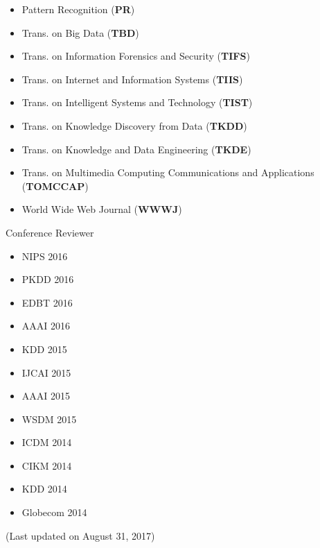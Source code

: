 \documentclass[margin, 9pt]{res}
\begin{document}
\begin{resume}
\begin{itemize}
\item Pattern Recognition (\textbf{PR})
\item Trans. on Big Data (\textbf{TBD})
\item Trans. on Information Forensics and Security (\textbf{TIFS})
\item Trans. on Internet and Information Systems (\textbf{TIIS})
\item Trans. on Intelligent Systems and Technology (\textbf{TIST})
\item Trans. on Knowledge Discovery from Data (\textbf{TKDD})
\item Trans. on Knowledge and Data Engineering (\textbf{TKDE})
\item Trans. on Multimedia Computing Communications and Applications (\textbf{TOMCCAP})
\item World Wide Web Journal (\textbf{WWWJ})
\end{itemize}
\vspace{-0.1in}
{Conference Reviewer}
\vspace{-0.15in}
\begin{multicols}{3}
\begin{itemize}
\item NIPS 2016
\item PKDD 2016
\item EDBT 2016
\item AAAI 2016
\item KDD 2015
\item IJCAI 2015
\item AAAI 2015
\item WSDM 2015
\item ICDM 2014
\item CIKM 2014
\item KDD 2014
\item Globecom 2014
\end{itemize}
\end{multicols}

(Last updated on August 31, 2017)
\end{resume}
\end{document}
